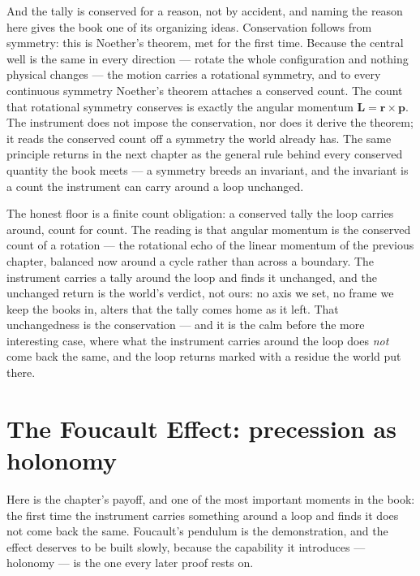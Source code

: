 And the tally is conserved for a reason, not by accident, and naming the reason here gives the book one of its
organizing ideas. Conservation follows from symmetry: this is Noether's theorem, met for the first time.
Because the central well is the same in every direction --- rotate the whole configuration and nothing
physical changes --- the motion carries a rotational symmetry, and to every continuous symmetry Noether's
theorem attaches a conserved count. The count that rotational symmetry conserves is exactly the angular
momentum $\mathbf{L} = \mathbf{r} \times \mathbf{p}$. The instrument does not impose the conservation, nor does
it derive the theorem; it reads the conserved count off a symmetry the world already has. The same principle
returns in the next chapter as the general rule behind every conserved quantity the book meets --- a symmetry
breeds an invariant, and the invariant is a count the instrument can carry around a loop unchanged.

The honest floor is a finite count obligation: a conserved tally the loop carries around, count for count.
The reading is that angular momentum is the conserved count of a rotation --- the rotational echo of the
linear momentum of the previous chapter, balanced now around a cycle rather than across a boundary. The
instrument carries a tally around the loop and finds it unchanged, and the unchanged return is the world's
verdict, not ours: no axis we set, no frame we keep the books in, alters that the tally comes home as it left.
That unchangedness is the conservation --- and it is the calm before the more interesting case, where what the
instrument carries around the loop does \emph{not} come back the same, and the loop returns marked with a
residue the world put there.

\section{The Foucault Effect: precession as holonomy}
\label{se:foucault}

Here is the chapter's payoff, and one of the most important moments in the book: the first time the
instrument carries something around a loop and finds it does not come back the same. Foucault's pendulum is
the demonstration, and the effect deserves to be built slowly, because the capability it introduces ---
holonomy --- is the one every later proof rests on.


